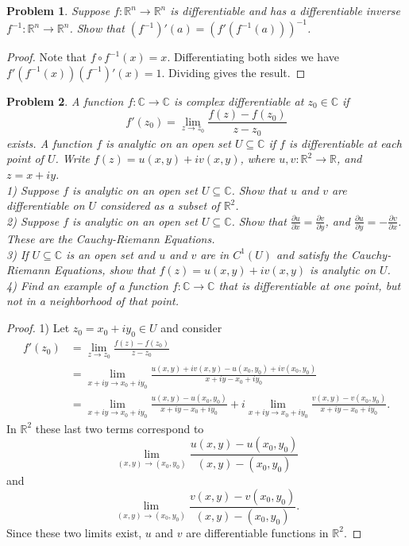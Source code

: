 \documentclass{article}
\newtheorem{problem}{Problem}
\begin{document}
\begin{flushleft}
\begin{problem}
Suppose $f : \mathbb{R}^n \rightarrow \mathbb{R}^n$ is differentiable and has a differentiable inverse $f^{-1} : \mathbb{R}^n \rightarrow \mathbb{R}^n$. Show that $(f^{-1})' (a) = (f' (f^{-1}(a)))^{-1}$.
\end{problem}
\begin{proof}
Note that $f \circ f^{-1}(x) = x$. Differentiating both sides we have $f'(f^{-1}(x))(f^{-1})'(x) = 1$. Dividing gives the result.
\end{proof}

\begin{problem}
A function $f : \mathbb{C} \rightarrow \mathbb{C}$ is complex differentiable at $z_0 \in \mathbb{C}$ if
\[
f'(z_0) = \lim_{z \rightarrow z_0} \frac{f(z) - f(z_0)}{z - z_0}
\]
exists. A function $f$ is analytic on an open set $U \subseteq \mathbb{C}$ if $f$ is differentiable at each point of $U$. Write $f(z) = u(x,y) + iv(x,y)$, where $u,v : \mathbb{R}^2 \rightarrow \mathbb{R}$, and $z = x + iy$.\\
1) Suppose $f$ is analytic on an open set $U \subseteq \mathbb{C}$. Show that $u$ and $v$ are differentiable on $U$ considered as a subset of $\mathbb{R}^2$.\\
2) Suppose $f$ is analytic on an open set $U \subseteq \mathbb{C}$. Show that $\frac{\partial u}{\partial x} = \frac{\partial v}{\partial y}$, and $\frac{\partial u}{\partial y} = -\frac{\partial v}{\partial x}$. These are the Cauchy-Riemann Equations.\\
3) If $U \subseteq \mathbb{C}$ is an open set and $u$ and $v$ are in $C^1(U)$ and satisfy the Cauchy-Riemann Equations, show that $f(z) = u(x,y) + iv(x,y)$ is analytic on $U$.\\
4) Find an example of a function $f : \mathbb{C} \rightarrow \mathbb{C}$ that is differentiable at one point, but not in a neighborhood of that point.
\end{problem}
\begin{proof}
1) Let $z_0 = x_0 + i y_0 \in U$ and consider
\begin{align*}
f'(z_0)
&= \lim_{z \rightarrow z_0} \frac{f(z) - f(z_0)}{z-z_0}\\
&= \lim_{x + iy \rightarrow x_0 + iy_0} \frac{u(x,y) + iv(x,y) - u(x_0,y_0) + iv(x_0,y_0)}{x+iy - x_0+iy_0}\\
&= \lim_{x + iy \rightarrow x_0 + iy_0} \frac{u(x,y) - u(x_0,y_0)}{x+iy - x_0+iy_0} + i\lim_{x + iy \rightarrow x_0 + iy_0} \frac{v(x,y) - v(x_0, y_0)}{x+iy - x_0+iy_0}.
\end{align*}
In $\mathbb{R}^2$ these last two terms correspond to
\[
\lim_{(x,y) \rightarrow (x_0,y_0)} \frac{u(x,y) - u(x_0,y_0)}{(x,y) - (x_0,y_0)}
\]
and
\[
\lim_{(x,y) \rightarrow (x_0,y_0)} \frac{v(x,y) - v(x_0,y_0)}{(x,y) - (x_0,y_0)}.
\]
Since these two limits exist, $u$ and $v$ are differentiable functions in $\mathbb{R}^2$.\newline


\end{proof}
\end{flushleft}
\end{document}
